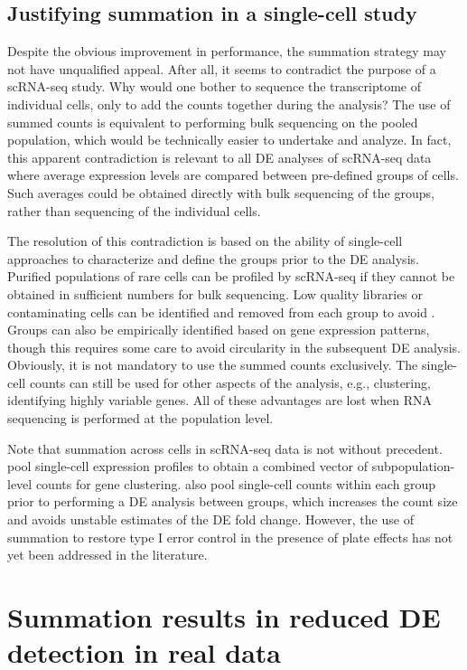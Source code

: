 \documentclass[oupdraft]{bio}
\begin{document}
\subsection{Justifying summation in a single-cell study}
Despite the obvious improvement in performance, the summation strategy may not have unqualified appeal.
After all, it seems to contradict the purpose of a scRNA-seq study. 
Why would one bother to sequence the transcriptome of individual cells, only to add the counts together during the analysis?
The use of summed counts is equivalent to performing bulk sequencing on the pooled population, which would be technically easier to undertake and analyze.
In fact, this apparent contradiction is relevant to all DE analyses of scRNA-seq data where average expression levels are compared between pre-defined groups of cells.
Such averages could be obtained directly with bulk sequencing of the groups, rather than sequencing of the individual cells.

The resolution of this contradiction is based on the ability of single-cell approaches to characterize and define the groups prior to the DE analysis.
Purified populations of rare cells can be profiled by scRNA-seq if they cannot be obtained in sufficient numbers for bulk sequencing.
Low quality libraries or contaminating cells can be identified and removed from each group to avoid .
Groups can also be empirically identified based on gene expression patterns, though this requires some care to avoid circularity in the subsequent DE analysis.
Obviously, it is not mandatory to use the summed counts exclusively. 
The single-cell counts can still be used for other aspects of the analysis, e.g., clustering, identifying highly variable genes.
All of these advantages are lost when RNA sequencing is performed at the population level.

Note that summation across cells in scRNA-seq data is not without precedent.
\cite{jaitin2014massively} pool single-cell expression profiles to obtain a combined vector of subpopulation-level counts for gene clustering.
\cite{klein2015droplet} also pool single-cell counts within each group prior to performing a DE analysis between groups,
    which increases the count size and avoids unstable estimates of the DE fold change.
However, the use of summation to restore type I error control in the presence of plate effects has not yet been addressed in the literature.

\section{Summation results in reduced DE detection in real data}
\end{document}
